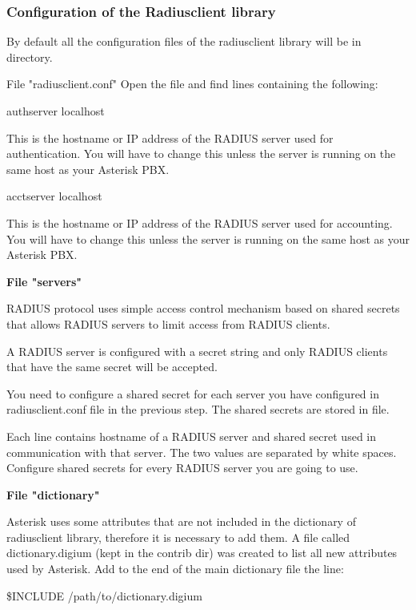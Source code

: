 \subsubsection{Configuration of the Radiusclient library}

	By default all the configuration files of the radiusclient library will
	be in  directory.

	File "radiusclient.conf"
		Open the file and find lines containing the following:

			authserver      localhost

	This is the hostname or IP address of the RADIUS server used for
	authentication. You will have to change this unless the server is
	running on the same host as your Asterisk PBX.

			acctserver      localhost

	This is the hostname or IP address of the RADIUS server used for
	accounting. You will have to change this unless the server is running
	on the same host as your Asterisk PBX.

	\textbf{File "servers"}

	RADIUS protocol uses simple access control mechanism based on shared
	secrets that allows RADIUS servers to limit access from RADIUS clients.

	A RADIUS server is configured with a secret string and only RADIUS
	clients that have the same secret will be accepted.

	You need to configure a shared secret for each server you have
	configured in radiusclient.conf file in the previous step. The shared
	secrets are stored in  file.

	Each line contains hostname of a RADIUS server and shared secret
	used in communication with that server. The two values are separated
	by white spaces. Configure shared secrets for every RADIUS server you
	are going to use.

	\textbf{File "dictionary"}

	Asterisk uses some attributes that are not included in the
	dictionary of radiusclient library, therefore it is necessary to add
	them. A file called dictionary.digium (kept in the contrib dir)
	was created to list all new attributes used by Asterisk.
	Add to the end of the main dictionary file
	 the line:

		\$INCLUDE /path/to/dictionary.digium

